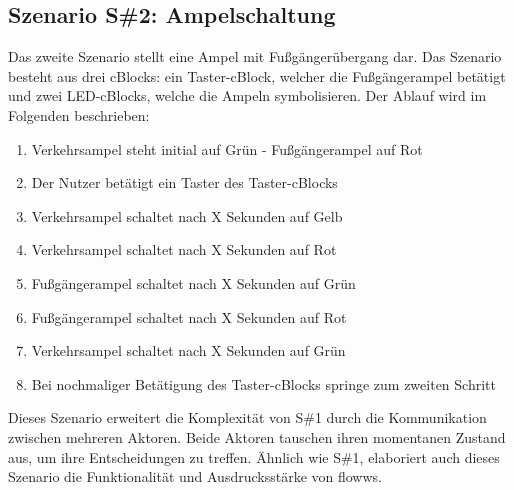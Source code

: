 \subsection{Szenario S\#2: Ampelschaltung}
Das zweite Szenario stellt eine Ampel mit Fußgängerübergang dar. Das Szenario besteht aus drei \ac{cBlocks}: ein Taster-cBlock, welcher die Fußgängerampel betätigt und zwei LED-cBlocks, welche die Ampeln symbolisieren. Der Ablauf wird im Folgenden beschrieben: 
\begin{enumerate}
    \item Verkehrsampel steht initial auf Grün - Fußgängerampel auf Rot
    \item Der Nutzer betätigt ein Taster des Taster-cBlocks
    \item Verkehrsampel schaltet nach X Sekunden auf Gelb
    \item Verkehrsampel schaltet nach X Sekunden auf Rot
    \item Fußgängerampel schaltet nach X Sekunden auf Grün
    \item Fußgängerampel schaltet nach X Sekunden auf Rot
    \item Verkehrsampel schaltet nach X Sekunden auf Grün
    \item Bei nochmaliger Betätigung des Taster-cBlocks springe zum zweiten Schritt
\end{enumerate}
Dieses Szenario erweitert die Komplexität von S\#1 durch die Kommunikation zwischen mehreren Aktoren. Beide Aktoren tauschen ihren momentanen Zustand aus, um ihre Entscheidungen zu treffen. Ähnlich wie S\#1, elaboriert auch dieses Szenario die Funktionalität und Ausdrucksstärke von flowws.

